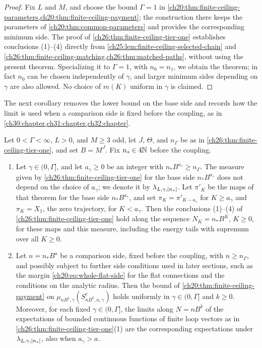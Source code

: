 \begin{proof}
Fix $L$ and $M$, and choose the bound $\Gamma=1$ in \cref{ch20:thm:finite-ceiling-parameters,ch20:thm:finite-ceiling-payment}; the construction there keeps the parameters of \cref{ch20:thm:common-parameters} and provides the corresponding minimum side. The proof of \cref{ch26:thm:finite-ceiling-tier-one} establishes conclusions (1)--(4) directly from \cref{ch25:lem:finite-ceiling-selected-chain} and \cref{ch26:thm:finite-ceiling-matching,ch26:thm:matched-paths}, without using the present theorem. Specializing it to $\Gamma=1$, with $n_0=n_1$, we obtain the theorem; in fact $n_0$ can be chosen independently of $\gamma$, and larger minimum sides depending on $\gamma$ are also allowed. No choice of $m(K)$ uniform in $\gamma$ is claimed.
\end{proof}

The next corollary removes the lower bound on the base side and records how the limit is used when a comparison side is fixed before the coupling, as in \cref{ch30:chapter,ch31:chapter,ch32:chapter}.

\begin{corollary}\label{ch26:cor:common-ladder-family}
Let $0<\Gamma<\infty$, $L>0$, and $M\ge3$ odd, let $J$, $\Theta$, and $n_\Gamma$ be as in \cref{ch26:thm:finite-ceiling-tier-one}, and set $B=M^J$. Fix $n_*\in4\mathbb N$ before the coupling.
\begin{enumerate}
\item Let $\gamma\in(0,\Gamma]$, and let $a_\gamma\ge0$ be an integer with $n_*B^{a_\gamma}\ge n_\Gamma$. The measure given by \cref{ch26:thm:finite-ceiling-tier-one} for the base side $n_*B^{a_\gamma}$ does not depend on the choice of $a_\gamma$; we denote it by $\lambda_{L,\gamma,[n_*]}$. Let $\pi'_K$ be the maps of that theorem for the base side $n_*B^{a_\gamma}$, and set $\pi_K=\pi'_{K-a_\gamma}$ for $K\ge a_\gamma$ and $\pi_K=X_1$, the zero trajectory, for $K<a_\gamma$. Then the conclusions (1)--(4) of \cref{ch26:thm:finite-ceiling-tier-one} hold along the sequence $N_K=n_*B^K$, $K\ge0$, for these maps and this measure, including the energy tails with supremum over all $K\ge0$.
\item Let $n=n_*B^a$ be a comparison side, fixed before the coupling, with $n\ge n_\Gamma$, and possibly subject to further side conditions used in later sections, such as the margin \eqref{ch20:eq:whole-flat-side} for the flat connections and the conditions on the analytic radius. Then the bound of \cref{ch20:thm:finite-ceiling-payment} on $\mu_{nB^k,\gamma}(S^c_{nB^k,n,\gamma})$ holds uniformly in $\gamma\in(0,\Gamma]$ and $k\ge0$. Moreover, for each fixed $\gamma\in(0,\Gamma]$, the limits along $N=nB^k$ of the expectations of bounded continuous functions of finite loop vectors as in \cref{ch26:thm:finite-ceiling-tier-one}(1) are the corresponding expectations under $\lambda_{L,\gamma,[n_*]}$, also when $a_\gamma>a$.
\end{enumerate}
\end{corollary}

